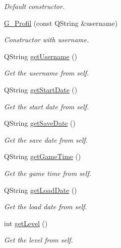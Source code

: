 \begin{DoxyCompactItemize}
\begin{DoxyCompactList}\small\item\em Default constructor. \end{DoxyCompactList}\item 
\hyperlink{class_g___profil_a8e70c5c39cc069ceb2accc2b67851b06}{G\+\_\+\+Profil} (const Q\+String \&username)
\begin{DoxyCompactList}\small\item\em Constructor with username. \end{DoxyCompactList}\item 
Q\+String \hyperlink{class_g___profil_ab8ffdb3c23a4021b2263af6f13a7bb1b}{get\+Username} ()
\begin{DoxyCompactList}\small\item\em Get the username from self. \end{DoxyCompactList}\item 
Q\+String \hyperlink{class_g___profil_ae97e1988dc62a9c734a0125b3c569d53}{get\+Start\+Date} ()
\begin{DoxyCompactList}\small\item\em Get the start date from self. \end{DoxyCompactList}\item 
Q\+String \hyperlink{class_g___profil_a52a7d06bd05574cb898eeb0d7fe89f47}{get\+Save\+Date} ()
\begin{DoxyCompactList}\small\item\em Get the save date from self. \end{DoxyCompactList}\item 
Q\+String \hyperlink{class_g___profil_ad4923c7a22c2b654ae9ac6bbf90a3a1f}{get\+Game\+Time} ()
\begin{DoxyCompactList}\small\item\em Get the game time from self. \end{DoxyCompactList}\item 
Q\+String \hyperlink{class_g___profil_a0621d82cf3b983c5dc0e73931d24f84f}{get\+Load\+Date} ()
\begin{DoxyCompactList}\small\item\em Get the load date from self. \end{DoxyCompactList}\item 
int \hyperlink{class_g___profil_a131ab813ae7e9de05f2bc37d4e30fcd1}{get\+Level} ()
\begin{DoxyCompactList}\small\item\em Get the level from self. \end{DoxyCompactList}\item 

\end{DoxyCompactItemize}
